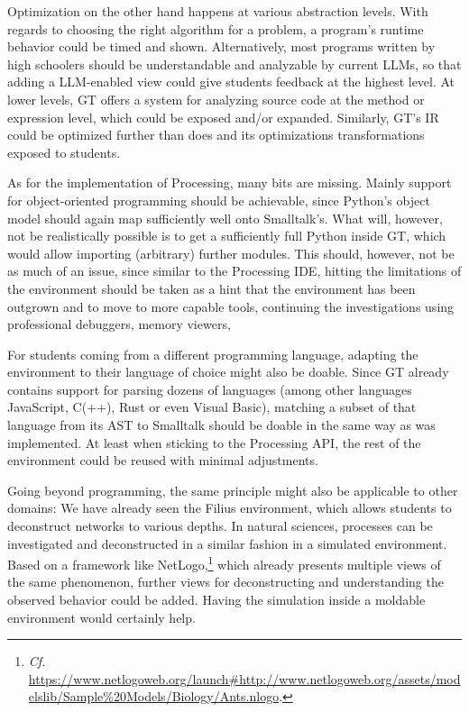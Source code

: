 Optimization on the other hand happens at various abstraction levels. With regards to choosing the right algorithm for a problem, a program's runtime behavior could be timed and shown. Alternatively, most programs written by high schoolers should be understandable and analyzable by current \acp{LLM}, so that adding a \ac{LLM}-enabled view could give students feedback at the highest level. At lower levels, \ac{GT} offers a  system for analyzing source code at the method or expression level, which could be exposed and/or expanded. Similarly, \ac{GT}'s \ac{IR} could be optimized further than  does and its optimizations transformations exposed to students.

As for the implementation of Processing, many bits are missing. Mainly support for object-oriented programming should be achievable, since Python's object model should again map sufficiently well onto Smalltalk's. What will, however, not be realistically possible is to get a sufficiently full Python inside \ac{GT}, which would allow importing (arbitrary) further modules. This should, however, not be as much of an issue, since similar to the Processing \ac{IDE}, hitting the limitations of the environment should be taken as a hint that the environment has been outgrown and to move to more capable tools, continuing the investigations using professional debuggers, memory viewers, \etc

For students coming from a different programming language, adapting the environment to their language of choice might also be doable. Since \ac{GT} already contains support for parsing dozens of languages (among other languages JavaScript, C(++), Rust or even Visual Basic), matching a subset of that language from its \ac{AST} to Smalltalk should be doable in the same way as  was implemented. At least when sticking to the Processing \ac{API}, the rest of the environment could be reused with minimal adjustments.

Going beyond programming, the same principle might also be applicable to other domains: We have already seen the Filius environment, which allows students to deconstruct networks to various depths. In natural sciences, processes can be investigated and deconstructed in a similar fashion in a simulated environment. Based on a framework like NetLogo,\footnote{\emph{Cf.} \eg \url{https://www.netlogoweb.org/launch\#http://www.netlogoweb.org/assets/modelslib/Sample\%20Models/Biology/Ants.nlogo}.} which already presents multiple views of the same phenomenon, further views for deconstructing and understanding the observed behavior could be added. Having the simulation inside a moldable environment would certainly help.

